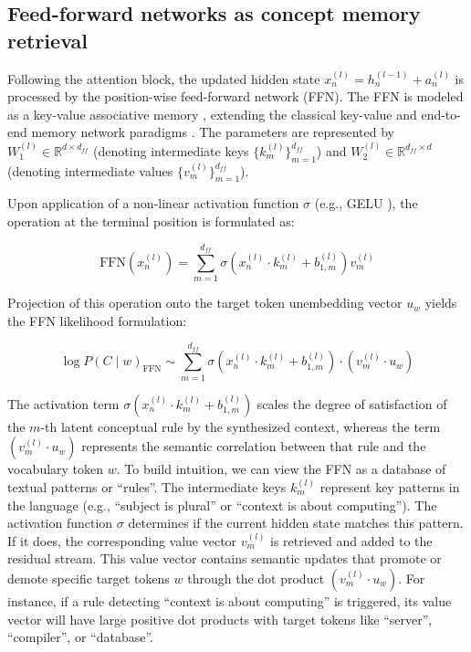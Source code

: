 \documentclass[11pt,a4paper]{article}
\begin{document}
	\subsection{Feed-forward networks as concept memory retrieval}
	Following the attention block, the updated hidden state $x_n^{(l)} = h_n^{(l-1)} + a_n^{(l)}$ is processed by the position-wise feed-forward network (FFN). The FFN is modeled as a key-value associative memory \citep{geva-etal-2021-transformer}, extending the classical key-value and end-to-end memory network paradigms \citep{sukhbaatar2015end, miller2016key}. The parameters are represented by $W_1^{(l)} \in \mathbb{R}^{d \times d_{ff}}$ (denoting intermediate keys $\{k_m^{(l)}\}_{m=1}^{d_{ff}}$) and $W_2^{(l)} \in \mathbb{R}^{d_{ff} \times d}$ (denoting intermediate values $\{v_m^{(l)}\}_{m=1}^{d_{ff}}$).
	
	Upon application of a non-linear activation function $\sigma$ (e.g., GELU \citep{hendrycks2016gelu}), the operation at the terminal position is formulated as:
	
	\begin{equation}
		\text{FFN}(x_n^{(l)}) = \sum_{m=1}^{d_{ff}} \sigma\left( x_n^{(l)} \cdot k_m^{(l)} + b_{1,m}^{(l)} \right) v_m^{(l)}
	\end{equation}
	
	Projection of this operation onto the target token unembedding vector $u_w$ yields the FFN likelihood formulation:
	
	\begin{equation}
		\log P(C \mid w)_{\text{FFN}} \sim \sum_{m=1}^{d_{ff}} \sigma\left( x_n^{(l)} \cdot k_m^{(l)} + b_{1,m}^{(l)} \right) \cdot (v_m^{(l)} \cdot u_w)
	\end{equation}
	
	The activation term $\sigma\left( x_n^{(l)} \cdot k_m^{(l)} + b_{1,m}^{(l)} \right)$ scales the degree of satisfaction of the $m$-th latent conceptual rule by the synthesized context, whereas the term $(v_m^{(l)} \cdot u_w)$ represents the semantic correlation between that rule and the vocabulary token $w$. To build intuition, we can view the FFN as a database of textual patterns or ``rules''. The intermediate keys $k_m^{(l)}$ represent key patterns in the language (e.g., ``subject is plural'' or ``context is about computing''). The activation function $\sigma$ determines if the current hidden state matches this pattern. If it does, the corresponding value vector $v_m^{(l)}$ is retrieved and added to the residual stream. This value vector contains semantic updates that promote or demote specific target tokens $w$ through the dot product $(v_m^{(l)} \cdot u_w)$. For instance, if a rule detecting ``context is about computing'' is triggered, its value vector will have large positive dot products with target tokens like ``server'', ``compiler'', or ``database''.
\end{document}

